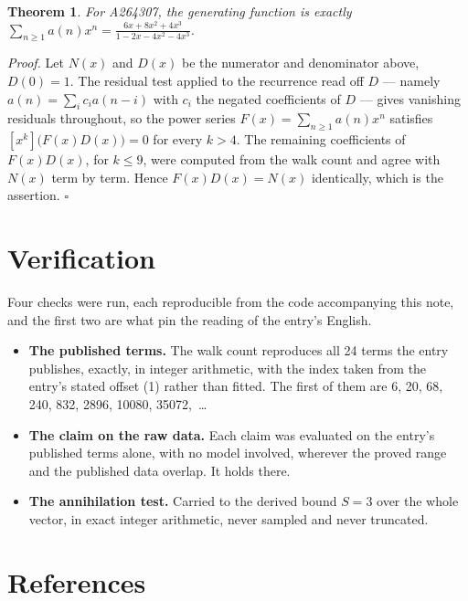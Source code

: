 \documentclass[11pt]{article}
\newtheorem{theorem}{Theorem}
\theoremstyle{definition}
\begin{document}
\begin{theorem} For A264307, the generating function is exactly $\sum_{n\ge 1} a(n)x^n = \frac{6x + 8x^{2} + 4x^{3}}{1 - 2x - 4x^{2} - 4x^{3}}$.\end{theorem}

{\itshape Proof.} Let $N(x)$ and $D(x)$ be the numerator and denominator above, $D(0)=1$. The residual test applied to the recurrence read off $D$ --- namely $a(n) = \sum_i c_i a(n-i)$ with $c_i$ the negated coefficients of $D$ --- gives vanishing residuals throughout, so the power series $F(x)=\sum_{n\ge 1}a(n)x^n$ satisfies $[x^k]\bigl(F(x)D(x)\bigr) = 0$ for every $k > 4$. The remaining coefficients of $F(x)D(x)$, for $k \le 9$, were computed from the walk count and agree with $N(x)$ term by term. Hence $F(x)D(x) = N(x)$ identically, which is the assertion. $\square$

\section{Verification}

Four checks were run, each reproducible from the code accompanying this note, and the first two are what pin the reading of the entry's English.

\begin{itemize}

\item {\bfseries The published terms.} The walk count reproduces all 24 terms the entry publishes, exactly, in integer arithmetic, with the index taken from the entry's stated offset (1) rather than fitted. The first of them are 6, 20, 68, 240, 832, 2896, 10080, 35072,~\dots

\item {\bfseries The claim on the raw data.} Each claim was evaluated on the entry's published terms alone, with no model involved, wherever the proved range and the published data overlap. It holds there.

\item {\bfseries The annihilation test.} Carried to the derived bound $S = 3$ over the whole vector, in exact integer arithmetic, never sampled and never truncated.

\end{itemize}

\section{References}
\end{document}
